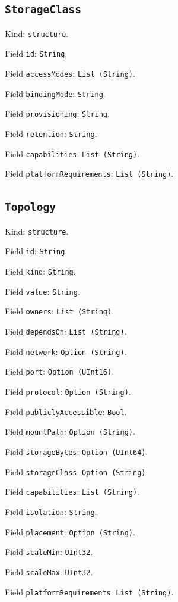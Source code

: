 \documentclass[11pt]{article}
\begin{document}
\subsection*{\texttt{StorageClass}}
\noindent Kind: \texttt{structure}.\par
\noindent Field \texttt{id}: \texttt{String}.\par
\noindent Field \texttt{accessModes}: \texttt{List (String)}.\par
\noindent Field \texttt{bindingMode}: \texttt{String}.\par
\noindent Field \texttt{provisioning}: \texttt{String}.\par
\noindent Field \texttt{retention}: \texttt{String}.\par
\noindent Field \texttt{capabilities}: \texttt{List (String)}.\par
\noindent Field \texttt{platformRequirements}: \texttt{List (String)}.\par
\subsection*{\texttt{Topology}}
\noindent Kind: \texttt{structure}.\par
\noindent Field \texttt{id}: \texttt{String}.\par
\noindent Field \texttt{kind}: \texttt{String}.\par
\noindent Field \texttt{value}: \texttt{String}.\par
\noindent Field \texttt{owners}: \texttt{List (String)}.\par
\noindent Field \texttt{dependsOn}: \texttt{List (String)}.\par
\noindent Field \texttt{network}: \texttt{Option (String)}.\par
\noindent Field \texttt{port}: \texttt{Option (UInt16)}.\par
\noindent Field \texttt{protocol}: \texttt{Option (String)}.\par
\noindent Field \texttt{publiclyAccessible}: \texttt{Bool}.\par
\noindent Field \texttt{mountPath}: \texttt{Option (String)}.\par
\noindent Field \texttt{storageBytes}: \texttt{Option (UInt64)}.\par
\noindent Field \texttt{storageClass}: \texttt{Option (String)}.\par
\noindent Field \texttt{capabilities}: \texttt{List (String)}.\par
\noindent Field \texttt{isolation}: \texttt{String}.\par
\noindent Field \texttt{placement}: \texttt{Option (String)}.\par
\noindent Field \texttt{scaleMin}: \texttt{UInt32}.\par
\noindent Field \texttt{scaleMax}: \texttt{UInt32}.\par
\noindent Field \texttt{platformRequirements}: \texttt{List (String)}.\par
\end{document}
